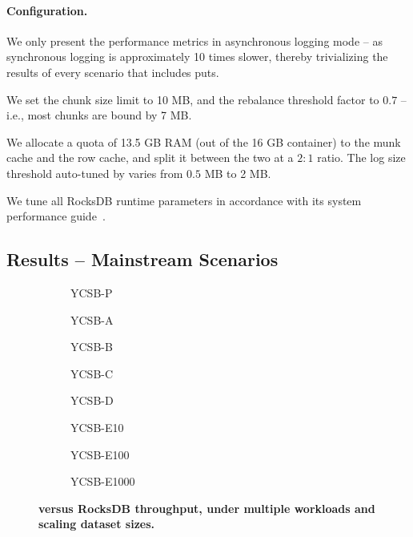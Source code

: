 \paragraph{Configuration.} 
We only present the performance metrics in asynchronous logging mode -- as synchronous logging 
is approximately 10 times slower, thereby trivializing the results of every scenario that includes puts. 

We set the \sys\/ chunk size limit to 10 MB, and the rebalance threshold factor to $0.7$ -- i.e., 
most chunks are bound by 7 MB. 

We allocate a quota of 13.5 GB RAM (out of the 16 GB container) to the munk cache and the row cache, 
and split it between the two at a $2:1$ ratio. The log size threshold auto-tuned by \sys\/ varies from    
$0.5$ MB to 2 MB. 

We tune all RocksDB runtime parameters in accordance with its system performance guide~\cite{RocksDBPerf}.   

\subsection{Results -- Mainstream Scenarios}

\begin{figure*}[tb]
\centering
\begin{subfigure}{0.3\linewidth}
\caption{YCSB-P}
\label{fig:throughput:p}
\end{subfigure}
\hspace{0.2\linewidth}
\begin{subfigure}{0.3\linewidth}
\caption{YCSB-A}
\label{fig:throughput:a}
\end{subfigure}
\begin{subfigure}{0.3\linewidth}
\caption{YCSB-B}
\label{fig:throughput:b}
\end{subfigure}
\begin{subfigure}{0.3\linewidth}
\caption{YCSB-C}
\label{fig:throughput:c}
\end{subfigure}
\begin{subfigure}{0.3\linewidth}
\caption{YCSB-D}
\label{fig:throughput:d}
\end{subfigure}
\begin{subfigure}{0.3\linewidth}
\caption{YCSB-E10}
\label{fig:throughput:e10}
\end{subfigure}
\begin{subfigure}{0.3\linewidth}
\caption{YCSB-E100}
\label{fig:throughput:e100}
\end{subfigure}
\begin{subfigure}{0.3\linewidth}
\caption{YCSB-E1000}
\label{fig:throughput:e1000}
\end{subfigure}
\caption{\bf{\sys\/ versus RocksDB throughput, under multiple workloads and scaling dataset sizes.}}
\label{fig:throughput}
\end{figure*}

